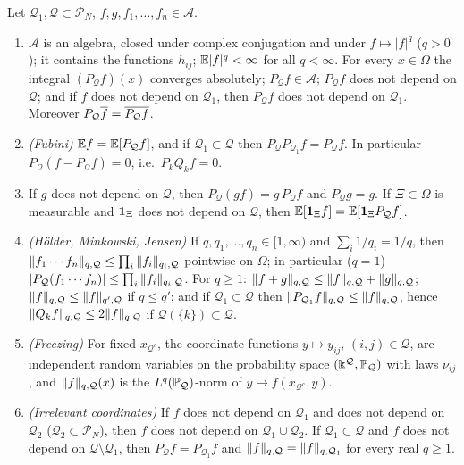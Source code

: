 \begin{lemma}\label{lem:FAfub}
Let $\mathcal Q_1,\mathcal Q\subset\mathcal P_N$, $f,g,f_1,\dots,f_n\in\mathcal A$.
\begin{enumerate}[label=\textup{(F\arabic*)},leftmargin=2.6em,itemsep=1pt,start=0]
\item $\mathcal A$ is an algebra, closed under complex conjugation and under $f\mapsto|f|^q$ ($q>0$); it contains the functions $h_{ij}$; $\mathbb{E}|f|^q<\infty$ for all $q<\infty$.
For every $x\in\Omega$ the integral $(P_{\mathcal Q}f)(x)$ converges absolutely; $P_{\mathcal Q}f\in\mathcal A$; $P_{\mathcal Q}f$ does not depend on $\mathcal Q$; and if $f$ does not depend on $\mathcal Q_1$, then $P_{\mathcal Q}f$ does not depend on $\mathcal Q_1$.
Moreover $P_{\mathcal Q}\overline{f}=\overline{P_{\mathcal Q}f}$.
\item \emph{(Fubini)} $\mathbb{E} f=\mathbb{E}[P_{\mathcal Q}f]$, and if $\mathcal Q_1\subset\mathcal Q$ then $P_{\mathcal Q}P_{\mathcal Q_1}f=P_{\mathcal Q}f$. In particular $P_{\mathcal Q}(f-P_{\mathcal Q}f)=0$, i.e.\ $P_kQ_kf=0$.
\item If $g$ does not depend on $\mathcal Q$, then $P_{\mathcal Q}(gf)=g\,P_{\mathcal Q}f$ and $P_{\mathcal Q}g=g$. If $\Xi\subset\Omega$ is measurable and $\mathbf{1}_\Xi$ does not depend on $\mathcal Q$, then $\mathbb{E}[\mathbf{1}_\Xi f]=\mathbb{E}[\mathbf{1}_\Xi P_{\mathcal Q}f]$.
\item \emph{(H\"older, Minkowski, Jensen)} If $q,q_1,\dots,q_n\in[1,\infty)$ and $\sum_i1/q_i=1/q$, then $\|f_1\cdots f_n\|_{q,\mathcal Q}\le\prod_{i}\|f_i\|_{q_i,\mathcal Q}$ pointwise on $\Omega$; in particular ($q=1$) $|P_{\mathcal Q}(f_1\cdots f_n)|\le\prod_{i}\|f_i\|_{q_i,\mathcal Q}$.
For $q\ge1$: $\|f+g\|_{q,\mathcal Q}\le\|f\|_{q,\mathcal Q}+\|g\|_{q,\mathcal Q}$; $\|f\|_{q,\mathcal Q}\le\|f\|_{q',\mathcal Q}$ if $q\le q'$; and if $\mathcal Q_1\subset\mathcal Q$ then $\|P_{\mathcal Q_1}f\|_{q,\mathcal Q}\le\|f\|_{q,\mathcal Q}$, hence $\|Q_kf\|_{q,\mathcal Q}\le2\|f\|_{q,\mathcal Q}$ if $\mathcal Q(\{k\})\subset\mathcal Q$.
\item \emph{(Freezing)} For fixed $x_{\mathcal Q^c}$, the coordinate functions $y\mapsto y_{ij}$, $(i,j)\in\mathcal Q$, are independent random variables on the probability space $(\Bbbk^{\mathcal Q},\mathbb{P}_{\mathcal Q})$ with laws $\nu_{ij}$,
and $\|f\|_{q,\mathcal Q}(x)$ is the $L^q(\mathbb{P}_{\mathcal Q})$-norm of $y\mapsto f(x_{\mathcal Q^c},y)$.
\item \emph{(Irrelevant coordinates)} If $f$ does not depend on $\mathcal Q_1$ and does not depend on $\mathcal Q_2$ ($\mathcal Q_2\subset\mathcal P_N$), then $f$ does not depend on $\mathcal Q_1\cup\mathcal Q_2$.
If $\mathcal Q_1\subset\mathcal Q$ and $f$ does not depend on $\mathcal Q\setminus\mathcal Q_1$, then $P_{\mathcal Q}f=P_{\mathcal Q_1}f$ and $\|f\|_{q,\mathcal Q}=\|f\|_{q,\mathcal Q_1}$ for every real $q\ge1$.
\end{enumerate}
\end{lemma}
